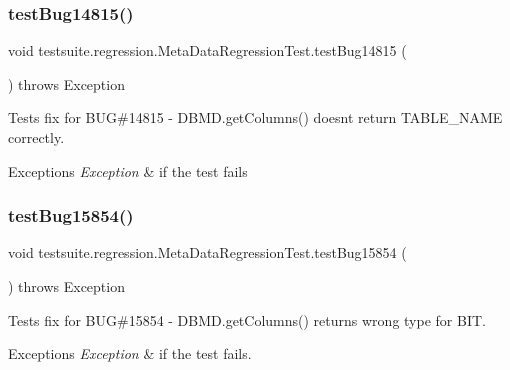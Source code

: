 \subsubsection{\texorpdfstring{test\+Bug14815()}{testBug14815()}}
{\footnotesize\ttfamily void testsuite.\+regression.\+Meta\+Data\+Regression\+Test.\+test\+Bug14815 (\begin{DoxyParamCaption}{ }\end{DoxyParamCaption}) throws Exception}

Tests fix for B\+UG\#14815 -\/ D\+B\+M\+D.\+get\+Columns() doesn\textquotesingle{}t return T\+A\+B\+L\+E\+\_\+\+N\+A\+ME correctly.


\begin{DoxyExceptions}{Exceptions}
{\em Exception} & if the test fails \\
\hline
\end{DoxyExceptions}
\mbox{\label{classtestsuite_1_1regression_1_1_meta_data_regression_test_ae112984f3c8acf28251912e13475421c}} 
\subsubsection{\texorpdfstring{test\+Bug15854()}{testBug15854()}}
{\footnotesize\ttfamily void testsuite.\+regression.\+Meta\+Data\+Regression\+Test.\+test\+Bug15854 (\begin{DoxyParamCaption}{ }\end{DoxyParamCaption}) throws Exception}

Tests fix for B\+UG\#15854 -\/ D\+B\+M\+D.\+get\+Columns() returns wrong type for B\+IT.


\begin{DoxyExceptions}{Exceptions}
{\em Exception} & if the test fails. \\
\hline
\end{DoxyExceptions}
\mbox{\label{classtestsuite_1_1regression_1_1_meta_data_regression_test_a7ddf69bf32cb524239b07b822585d44d}} 
